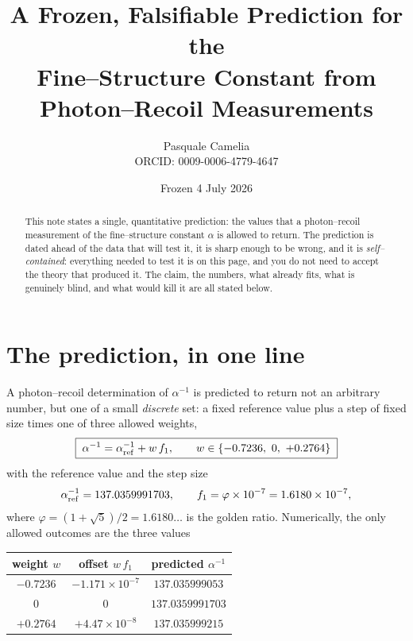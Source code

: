 \documentclass[11pt]{article}
\title{\bfseries A Frozen, Falsifiable Prediction for the\\
Fine--Structure Constant from Photon--Recoil Measurements}
\author{Pasquale Camelia\\ \normalsize ORCID: 0009-0006-4779-4647}
\date{Frozen 4 July 2026}
\begin{document}
\maketitle

\begin{abstract}\noindent
This note states a single, quantitative prediction: the values that a
photon--recoil measurement of the fine--structure constant $\alpha$ is allowed
to return. The prediction is dated ahead of the data that will test it, it is
sharp enough to be wrong, and it is \emph{self--contained}: everything needed to
test it is on this page, and you do not need to accept the theory that produced
it. The claim, the numbers, what already fits, what is genuinely blind, and what
would kill it are all stated below.
\end{abstract}

\section{The prediction, in one line}

A photon--recoil determination of $\alpha^{-1}$ is predicted to return not an
arbitrary number, but one of a small \emph{discrete} set: a fixed reference value
plus a step of fixed size times one of three allowed weights,
\begin{equation}
\boxed{\;\alpha^{-1}=\alpha^{-1}_{\rm ref}+w\,f_1,\qquad
w\in\{-0.7236,\ 0,\ +0.2764\}\;}
\end{equation}
with the reference value and the step size
\begin{equation}
\alpha^{-1}_{\rm ref}=137.0359991703,\qquad
f_1=\varphi\times10^{-7}=1.6180\times10^{-7},
\end{equation}
where $\varphi=(1+\sqrt5)/2=1.6180\ldots$ is the golden ratio. Numerically, the
only allowed outcomes are the three values
\begin{center}
\small\renewcommand{\arraystretch}{1.3}
\begin{tabular}{ccc}
\toprule
weight $w$ & offset $w\,f_1$ & predicted $\alpha^{-1}$\\
\midrule
$-0.7236$ & $-1.171\times10^{-7}$ & $137.035999053$\\
$0$       & $0$                   & $137.0359991703$\\
$+0.2764$ & $+4.47\times10^{-8}$  & $137.035999215$\\
\bottomrule
\end{tabular}
\end{center}
\end{document}
